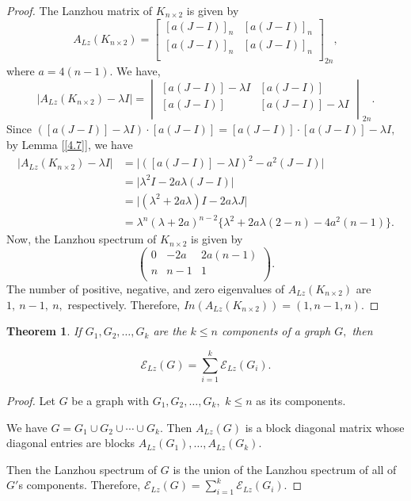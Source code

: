 \documentclass[10pt,a4paper,oneside]{article}
\newtheorem{theorem}{Theorem}
\begin{document}
\begin{proof}
	The Lanzhou matrix of $K_{n\times 2}$ is given by 
	$$ A_{Lz}(K_{n\times 2})=\begin{bmatrix}
		[a(J-I)]_{n} & [a(J-I)]_{n} \\
		[a(J-I)]_{n} & [a(J-I)]_{n}\\
	\end{bmatrix}_{2n},$$
	where $a=4(n-1).$
	We have,
	$$ \vert A_{Lz}(K_{n\times 2})-\lambda I\vert =\begin{vmatrix}
		[a(J-I)]-\lambda I & [a(J-I)] \\
		[a(J-I)] & [a(J-I)]-\lambda I\\
	\end{vmatrix}_{2n}.$$
	Since $([a(J-I)]-\lambda I )\cdot [a(J-I)]= [a(J-I)]\cdot [a(J-I)]-\lambda I,$ by Lemma [\ref{4.7}], we have
	\begin{align*}
		\vert A_{Lz}(K_{n\times 2})-\lambda I\vert &=\vert ([a(J-I)]-\lambda I)^2-a^2(J-I)\vert \\&=\vert \lambda^2I-2a\lambda (J-I)\vert\\&=\vert (\lambda^2+2a\lambda)I-2a\lambda J\vert \\&=\lambda^n(\lambda+2a)^{n-2} \{\lambda^2+2a\lambda(2-n)-4a^2(n-1)\}.
	\end{align*}
	Now, the Lanzhou spectrum of $K_{n\times 2}$ is given by $$\begin{pmatrix}
		0 & -2a & 2a(n-1)\\
		n & n-1 & 1 \\
	\end{pmatrix}.$$
The number of positive, negative, and zero eigenvalues of $A_{Lz}(K_{n\times 2})$ are $1,\ n-1,\ n,$ respectively.
Therefore, $In(A_{Lz}(K_{n\times 2}))=(1,n-1,n).$
\end{proof}
\begin{theorem}\label{4.18}
If $G_1, G_2, \ldots, G_k$ are the $k\leq n$ components of a graph $G,$ then 
	
$$\mathcal{E}_{Lz}(G)=\sum\limits_{i=1}^{k}\mathcal{E}_{Lz}(G_i).$$
\end{theorem}
\begin{proof}
Let $G$ be a graph with $G_1, G_2, \ldots, G_k,$ $k\leq n$ as its components.
	
We have $G=G_1\cup G_2 \cup \cdots \cup G_k.$ Then $A_{Lz}(G)$ is a block diagonal matrix whose diagonal entries are blocks $A_{Lz}(G_1), \ldots, A_{Lz}(G_k).$
	
Then the Lanzhou spectrum of $G$ is the union of the Lanzhou spectrum of all of $G'$s components. Therefore, $\mathcal{E}_{Lz}(G)=\sum\limits_{i=1}^{k}\mathcal{E}_{Lz}(G_i).$
\end{proof}
\end{document}
